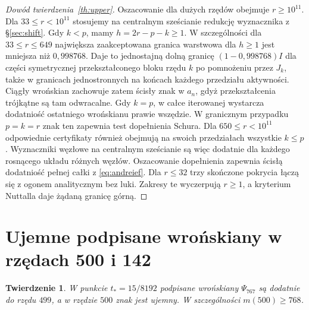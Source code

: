 \documentclass[11pt,a4paper,reqno]{amsart}
\newtheorem{theorem}{Twierdzenie}[section]
\numberwithin{equation}{section}
\begin{document}
\begin{proof}[Dowód twierdzenia~\ref{th:upper}]
Oszacowanie dla dużych rzędów obejmuje \(r\ge10^{11}\). Dla \(33\le r<10^{11}\) stosujemy na centralnym sześcianie redukcję wyznacznika z \S\ref{sec:shift}. Gdy \(k<p\), mamy \(h=2r-p-k\ge1\). W szczególności dla \(33\le r\le649\) największa zaakceptowana granica warstwowa dla \(h\ge1\) jest mniejsza niż \(0{,}998768\). Daje to jednostajną dolną granicę \((1-0{,}998768)I\) dla części symetrycznej przekształconego bloku rzędu \(k\) po pomnożeniu przez \(J_k\), także w granicach jednostronnych na końcach każdego przedziału aktywności. Ciągły wrońskian zachowuje zatem ścisły znak w \(a_n\), gdyż przekształcenia trójkątne są tam odwracalne. Gdy \(k=p\), w całce iterowanej wystarcza dodatniość ostatniego wrońskianu prawie wszędzie. W granicznym przypadku \(p=k=r\) znak ten zapewnia test dopełnienia Schura. Dla \(650\le r<10^{11}\) odpowiednie certyfikaty również obejmują na swoich przedziałach wszystkie \(k\le p\). Wyznaczniki węzłowe na centralnym sześcianie są więc dodatnie dla każdego rosnącego układu różnych węzłów. Oszacowanie dopełnienia zapewnia ścisłą dodatniość pełnej całki z \eqref{eq:andreief}. Dla \(r\le32\) trzy skończone pokrycia łączą się z ogonem analitycznym bez luki. Zakresy te wyczerpują \(r\ge1\), a kryterium Nuttalla daje żądaną granicę górną.
\end{proof}


\section{Ujemne podpisane wrońskiany w rzędach 500 i 142}\label{sec:witness}


\begin{theorem}\label{th:witness}
W punkcie \(t_*=15/8192\) podpisane wrońskiany \(\Psi_{767}\) są dodatnie do rzędu \(499\), a w rzędzie \(500\) znak jest ujemny. W szczególności \(m(500)\ge768\).
\end{theorem}
\end{document}
